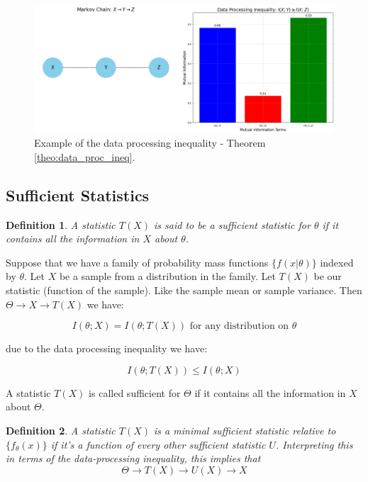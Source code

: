 \documentclass[a4paper,10pt]{article}
\newtheorem{definition}{Definition}[section] %
\newcommand{\hlt}[1]{\colorbox{color3}{#1}}
\begin{document}
\begin{figure}[ht]
    \centering
    \includegraphics[width=0.7\linewidth]{Figures/dara_process_inequality.png}
    \caption{Example of the data processing inequality - Theorem \ref{theo:data_proc_ineq}.}
    \label{fig:data_process_inequality}
\end{figure}

\subsection{Sufficient Statistics}

\begin{definition}
    A statistic $T(X)$ is said to be a \hlt{sufficient statistic} for $\theta$ if it contains all the information in $X$ about $\theta$.
\end{definition}


Suppose that we have a family of probability mass functions $\{f(x|\theta)\}$ indexed by $\theta$. Let $X$ be a sample from a distribution in the family. Let $T(X)$ be our statistic (function of the sample). Like the sample mean or sample variance. Then \hlt{$\Theta \rightarrow X \rightarrow T(X)$} we have:

\[
I(\theta; X) = I(\theta; T(X)) \text{ for any distribution on } \theta
\]

\noindent due to the data processing inequality we have:

\[
I(\theta; T(X)) \leq I(\theta; X)
\]

A statistic $T(X)$ is called \hlt{sufficient} for $\Theta$ if it contains all the information in $X$ about $\Theta$.

\begin{definition}
    A statistic $T(X)$ is a \hlt{minimal sufficient statistic} relative to $\{ f_\theta(x) \}$ if it's a function of every other sufficient statistic $U$. Interpreting this in terms of the data-processing inequality, this implies that 
    \[
        \Theta \rightarrow T(X) \rightarrow U(X) \rightarrow X
    \]
\end{definition}
\end{document}
